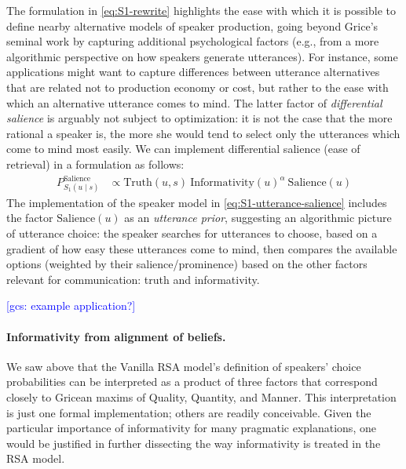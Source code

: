 \documentclass{sp}
\newcommand{\gcs}[1]{\textcolor{blue}{[gcs: #1]}}
\newcommand{\mf}[1]{\textcolor{orange}{[mf: #1]}}
\begin{document}
The formulation in \eqref{eq:S1-rewrite} highlights the ease with which it is possible to define nearby
alternative models of speaker production, going beyond Grice's seminal work by
capturing additional psychological factors (e.g., from a more algorithmic perspective on how speakers
generate utterances). For instance, some applications might want to capture differences between
utterance alternatives that are related not to production economy or cost, but rather to the
ease with which an alternative utterance comes to mind. The latter factor of \emph{differential
  salience} is arguably not subject to optimization: it is not the case that the more rational
a speaker is, the more she would tend to select only the utterances which come to mind most
easily. We can implement differential salience (ease of retrieval) in a
formulation as follows:
%
\begin{align}
  \label{eq:S1-utterance-salience}
  P_{S_1(u\mid s)}^{\text{Salience}}   & \propto \text{Truth}(u,s) \ \text{Informativity}(u)^{\alpha} \ \text{Salience}(u)
\end{align}
The implementation of the speaker model in \eqref{eq:S1-utterance-salience} includes the
factor $\text{Salience}(u)$ as an \emph{utterance prior}, suggesting an algorithmic
picture of utterance choice: the speaker searches for utterances to choose, based on a gradient
of how easy these utterances come to mind, then compares the available options (weighted by
their salience/prominence) based on the other factors relevant for communication: truth and
informativity. 

\gcs{example application?}

\paragraph{Informativity from alignment of beliefs.} We saw above that the Vanilla RSA
model's definition of speakers' choice probabilities can be interpreted as a product of three
factors that correspond closely to Gricean maxims of Quality, Quantity, and Manner.
This interpretation is just one formal implementation; others are readily conceivable. Given the particular
importance of informativity for many pragmatic explanations, one would be justified in further dissecting
the way informativity is treated in the RSA model.
\end{document}

